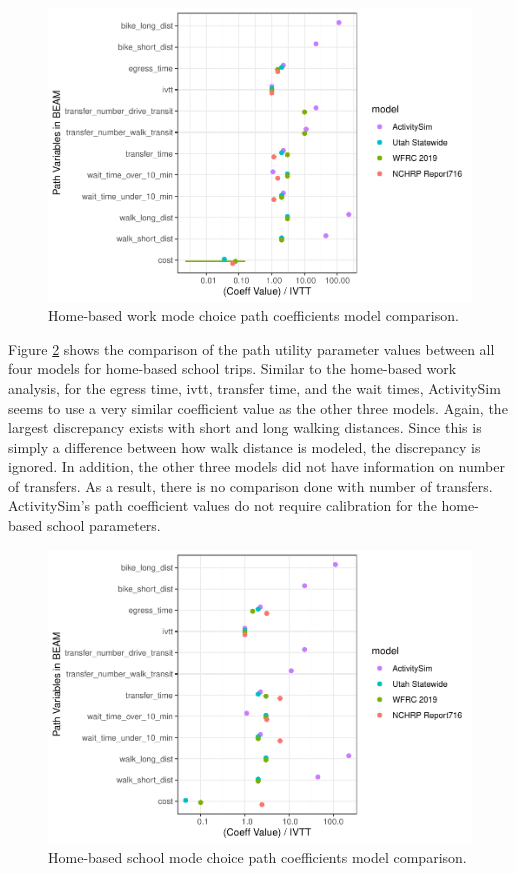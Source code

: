 \documentclass[12pt, oneside, openright]{byuthesis}
\begin{document}
\begin{figure}

{\centering \includegraphics{thesis_files/figure-latex/hbw-1} 

}

\caption{Home-based work mode choice path coefficients model comparison.}\label{fig:hbw}
\end{figure}

Figure \ref{fig:hbs} shows the comparison of the path utility parameter values between all four models for home-based school trips. Similar to the home-based work analysis, for the egress time, ivtt, transfer time, and the wait times, ActivitySim seems to use a very similar coefficient value as the other three models. Again, the largest discrepancy exists with short and long walking distances. Since this is simply a difference between how walk distance is modeled, the discrepancy is ignored. In addition, the other three models did not have information on number of transfers. As a result, there is no comparison done with number of transfers. ActivitySim's path coefficient values do not require calibration for the home-based school parameters.

\begin{figure}

{\centering \includegraphics{thesis_files/figure-latex/hbs-1} 

}

\caption{Home-based school mode choice path coefficients model comparison.}\label{fig:hbs}
\end{figure}
\end{document}
